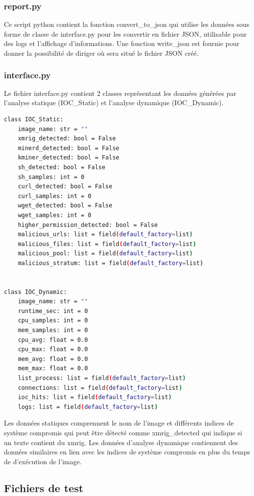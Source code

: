 \subsubsection{report.py}
Ce script python contient la fonction convert\_to\_json qui utilise les données sous forme de classe de interface.py pour les convertir en fichier JSON, utilisable pour des logs et l'affichage d'informations. Une fonction write\_json est fournie pour donner la possibilité de diriger où sera situé le fichier JSON créé.

\subsubsection{interface.py}
Le fichier interface.py contient 2 classes représentant les données générées par l'analyse statique (IOC\_Static) et l'analyse dynamique (IOC\_Dynamic). 

\begin{lstlisting}[language=bash, caption=interface.py]
class IOC_Static:
    image_name: str = ""
    xmrig_detected: bool = False
    minerd_detected: bool = False
    kminer_detected: bool = False
    sh_detected: bool = False
    sh_samples: int = 0
    curl_detected: bool = False
    curl_samples: int = 0
    wget_detected: bool = False
    wget_samples: int = 0
    higher_permission_detected: bool = False
    malicious_urls: list = field(default_factory=list)
    malicious_files: list = field(default_factory=list)
    malicious_pool: list = field(default_factory=list)
    malicious_stratum: list = field(default_factory=list)


class IOC_Dynamic:
    image_name: str = ""
    runtime_sec: int = 0
    cpu_samples: int = 0
    mem_samples: int = 0
    cpu_avg: float = 0.0
    cpu_max: float = 0.0
    mem_avg: float = 0.0
    mem_max: float = 0.0
    list_process: list = field(default_factory=list)
    connections: list = field(default_factory=list)
    ioc_hits: list = field(default_factory=list)
    logs: list = field(default_factory=list)
\end{lstlisting}

Les données statiques comprennent le nom de l'image et différents indices de système compromis qui peut être détecté comme xmrig\_detected qui indique si un texte contient du xmrig. Les données d'analyse dynamique contiennent des données similaires en lien avec les indices de système compromis en plus du temps de d'exécution de l'image.

\subsection{Fichiers de test}
